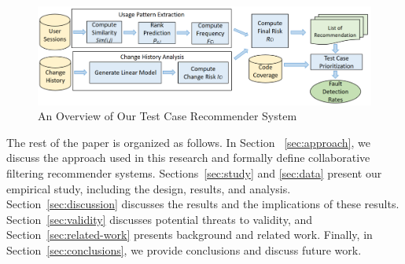 \begin{figure}[!hb]
\vspace*{-4pt}
        \centering
        \includegraphics[width=0.85\linewidth]{./Overview10.png}
        \vspace*{3pt}
        \caption{An Overview of Our Test Case Recommender System}
        \label{fig:workflow}
\end{figure}


The rest of the paper is organized as follows. In Section ~\ref{sec:approach}, we
discuss the approach used in this research and formally define
collaborative filtering recommender systems. 
Sections~\ref{sec:study} and \ref{sec:data} present our empirical study,
including the design, results, and analysis.
Section~\ref{sec:discussion} discusses the results and the implications of these results. 
Section~\ref{sec:validity} discusses potential threats to validity, and
Section~\ref{sec:related-work} presents background and related work. 
Finally, in Section~\ref{sec:conclusions}, 
we provide conclusions and discuss future work.

